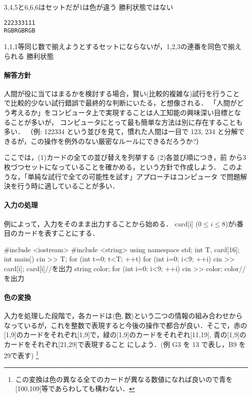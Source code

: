 3,4,5と6,6,6はセットだが1は色が違う \dingright{} 勝利状態ではない

\begin{alltt}
2 2 2 3 3 3 1 1 1
R G B R G B R G B
\end{alltt}

1,1,1等同じ数で揃えようとするセットにならないが，1,2,3の連番を同色で揃えられる \dingright{} 勝利状態

\paragraph{解答方針}

人間が役に当てはまるかを検討する場合，賢い(比較的複雑な)試行を行うこと
で比較的少ない試行錯誤で最終的な判断にいたる，と想像される．
「人間がどう考えるか」をコンピュータ上で実現することは人工知能の興味深い目標とな
ることが多いが，
コンピュータにとって最も簡単な方法は別に存在することも多い．
（例: 122334 という並びを見て，慣れた人間は一目で 123, 234 と分解できるが，この操作を例外のない厳密なルールにできるだろうか?）

ここでは，(1)カードの全ての並び替えを列挙する (2)各並び順につき，前
から3枚づつセットになっていることを確かめる，という方針で作成しよう．
このような，「単純な試行で全ての可能性を試す」アプローチはコンピュータ
で問題解決を行う時に適していることが多い．

\paragraph{入力の処理}

例によって，入力をそのまま出力することから始める．
card[i] ($0\le i\le8$)がi番目のカードを表すことにする．

\begin{cbox}
#include <iostream>
#include <string>
using namespace std;
int T, card[16];
int main() {
    cin >> T;
    for (int t=0; t<T; ++t) {
        for (int i=0; i<9; ++i) {
          cin >> card[i];
          card[i]//を出力
        }
        string color;
        for (int i=0; i<9; ++i) {
          cin >> color;
          color//を出力
        }
    }
}
\end{cbox}

\paragraph{色の変換}

入力を処理した段階で，各カードは$\langle\mbox{色},数\rangle$という二つの情報の組み合わせからなっているが，これを整数で表現すると今後の操作で都合が良い．そこで，赤の[1,9]のカードをそれぞれ[1,9]で，緑の[1,9]のカードをそれぞれ[11,19], 青の[1,9]のカードをそれぞれ[21,29]で表現すること
にしよう．(例 G3 を 13 で表し，B9 を29で表す) \footnote{この変換は色の異なる全てのカードが異なる数値になれば良いので青を[100,109]等であらわしても構わない．}


